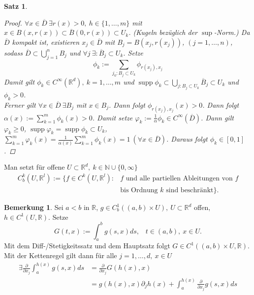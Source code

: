 \documentclass[a4paper]{scrreprt}
\newcommand{\R}{\mathbb{R}}
\newcommand{\N}{\mathbb{N}}
\newcommand{\jlabel}[1]{\label{j_#1}}
\newcommand{\supp}{\mathop{\mathrm{{supp}}}}
\theoremstyle{plain}
\newtheorem{satz}[thm]{Satz}
\theoremstyle{definition}
\newtheorem*{bem*}{Bemerkung}
\begin{document}
{{{{\begin{satz}
     \begin{proof}
         $\forall x \in \overline{D}\ \exists r(x) >0, \ h\in \{1,\dots,m\}$ mit $x\in B(x,r(x))\subset \overline{B}(0,r(x))\subset U_k$. (Kugeln bezüglich der $\sup$-Norm.) Da $\overline{D}$ kompakt ist, existieren $x_j\in \overline{D}$ mit $B_j = B(x_j, r(x_j))$, $(j=1,\dots,n)$, sodass $\overline{D} \subset \bigcup_{j=1}^n B_j$ und $\forall j\ \exists: \overline{B}_j \subset U_k$. Setze
        \[
            \phi_k := \sum_{j_0 : B_j \subset U_k} \phi_{r(x_j),x_j}
        \]
        Damit gilt $\phi_k \in C^\infty(\R^d), \ k=1,\dots,m$ und $\supp \phi_k \subset \bigcup_{j: B_j \subset U_k} \overline{B}_j\subset U_k$ und $\phi_k > 0$.\\
        Ferner gilt $\forall x\in \overline{D} \ \exists B_j$ mit $x\in B_j$. Dann folgt $\phi_{r(x_j),x_j}(x) >0$. Dann folgt $\alpha(x) := \sum_{k=1}^m \phi_k(x) >0$. Damit setze $\varphi_k := \frac{1}{\alpha} \phi_k \in C^\infty(\overline{D})$. Dann gilt $\varphi_k \ge 0$, $\supp \varphi_k = \supp \phi_k \subset U_k$, $\sum_{k=1}^m \varphi_k(x) = \frac{1}{\alpha(x)} \sum_{k=1}^m \phi_k(x) = 1\ (\forall x\in \overline{D})$. Daraus folgt $\phi_k \in [0,1]$.
     \end{proof}
\end{satz}

Man setzt für offene $U\subset \R^d, \ k\in \N \cup \{0,\infty\}$
\[
    \begin{split}
        C_b^k(U,\R^l) := \{f \in C^k(U,\R^l) : &f \text{ und alle partiellen Ableitungen von } f\\
                                               &\text{bis Ordnung $k$ sind beschränkt}\}.
    \end{split}
\]

\begin{bem*}
    Sei $a<b$ in $\R$, $g\in C_b^1((a,b)\times U), \ U\subset \R^d$ offen, $h\in C^1(U, \R)$. Setze 
    \[
        G(t,x):= \int_a^b g(s,x)ds, \hspace{10pt} t\in(a,b), \ x\in U.
    \]
    Mit dem Diff-/Stetigkeitssatz und dem Hauptsatz folgt $G\in C^1((a,b)\times U, \R)$. Mit der Kettenregel gilt dann für alle $j=1,\dots,d, \ x\in U$
    \begin{equation}
        \jlabel{(4.6)}
        \begin{split}
            \exists \frac{\partial}{\partial x_j} \int_a^{h(x)} g(s,x)ds &= \frac{\partial}{\partial x_j} G(h(x),x)\\
            &= g(h(x),x)\partial_j h(x) + \int_a^{h(x)} \frac{\partial}{\partial x_j} g(s,x) ds
        \end{split}
    \end{equation}



\end{bem*}}}}}
\end{document}
